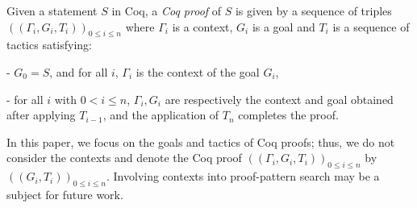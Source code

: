 
\begin{definition}
 Given a statement $S$ in Coq, a \emph{Coq proof} of $S$ is given by a sequence of triples $((\Gamma_i,G_i,T_i))_{0\leq i\leq n}$ where $\Gamma_i$ is a context,
 $G_i$ is a goal and $T_i$ is a sequence of tactics satisfying:

  - $G_0=S$, and for all $i$, $\Gamma_i$ is the context of the goal $G_i$,
  
  - for all $i$ with $0<i\leq n$, $\Gamma_i,G_i$ are respectively the context and goal obtained after applying $T_{i-1}$, and 
    the application of $T_n$ completes the proof.
\end{definition}

In this paper, we focus on the goals and tactics of Coq proofs; thus, we do not consider the contexts and denote the 
Coq proof $((\Gamma_i,G_i,T_i))_{0\leq i\leq n}$ by $((G_i,T_i))_{0\leq i\leq n}$. Involving contexts into proof-pattern search may be a subject for future work. 


